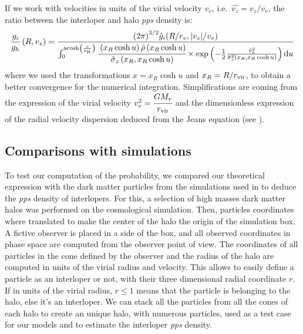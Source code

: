 If we work with velocities in units of the virial velocity $v_v$, i.e.\
$\hat{v_z}=v_z/v_v$, the ratio between the interloper and halo \emph{pps}
density is:
%
\begin{equation}
    \label{eq:gi_over_gh}
    \frac{g_i}{g_h}\left(R,v_z\right)=
    \frac{{\left(2\pi\right)}^{3/2}\hat{g}_i{(R/r_v,|v_z|/v_v)}}
        {\int_0^{\rm{acosh}\left(\frac{c}{x_R}\right)}
            \cfrac{\left(x_R\cosh{u}\right)\tilde\rho\left(x_R\cosh{u}\right)}
            {{\tilde\sigma}_z\left(x_R,x_R\cosh{u}\right)}
    \times\exp\left(-\frac{1}{2}\frac{{\hat{v}_z}^2}
    {{\tilde\sigma}_z^2\left(x_R,x_R\cosh{u}\right)}\right){\rm{d}} u}
\end{equation}
%
where we used the transformations $x=x_R\cosh u$ and $x_R=R/r_{\rm vir}$, to obtain a
better convergence for the numerical integration. Simplifications are coming
from the expression of the virial velocity $v_v^2=\cfrac{G M_v}{r_{\rm vir}}$
and the dimensionless expression of the radial velocity dispersion deduced from
the Jeans equation (see \bartrefappendix{profiles}).

\subsection{Comparisons with simulations}
\label{sub:comparisons_with_simulations}

To test our computation of the probability, we compared our theoretical
expression with the dark matter particles from the simulations used in
\citet{MBM+10} to deduce the \emph{pps} density of interlopers. For this, a
selection of high masses dark matter halos was performed on the cosmological
simulation. Then, particles coordinates where translated to make the center of
the halo the origin of the simulation box. A fictive observer is placed in a
side of the box, and all observed coordinates in phase space are computed from
the observer point of view. The coordinates of all particles in the cone
defined by the observer and the radius of the halo are computed in units of the
virial radius and velocity. This allows to easily define a particle as an
interloper or not, with their three dimensional radial coordinate $r$. If in units
of the virial radius, $r\leqslant1$ means that the particle is belonging to the
halo, else it's an interloper. We can stack all the particles from all the
cones of each halo to create an unique halo, with numerous particles, used as a
test case for our models and to estimate the interloper \emph{pps} density.

